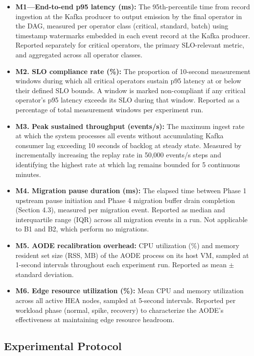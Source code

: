 \documentclass[preprint,review,12pt]{elsarticle}
\begin{document}
\begin{itemize}
\item
  \textbf{M1—End-to-end p95 latency (ms):} The 95th-percentile time from record ingestion at the Kafka producer to output emission by the final operator in the DAG, measured per operator class (critical, standard, batch) using timestamp watermarks embedded in each event record at the Kafka producer. Reported separately for critical operators, the primary SLO-relevant metric, and aggregated across all operator classes.
\item
  \textbf{M2. SLO compliance rate (\%):} The proportion of 10-second measurement windows during which all critical operators sustain p95 latency at or below their defined SLO bounds. A window is marked non-compliant if any critical operator's p95 latency exceeds its SLO during that window. Reported as a percentage of total measurement windows per experiment run.
\item
  \textbf{M3. Peak sustained throughput (events/s):} The maximum ingest rate at which the system processes all events without accumulating Kafka consumer lag exceeding 10 seconds of backlog at steady state. Measured by incrementally increasing the replay rate in 50,000 events/s steps and identifying the highest rate at which lag remains bounded for 5 continuous minutes.
\item
  \textbf{M4. Migration pause duration (ms):} The elapsed time between Phase 1 upstream pause initiation and Phase 4 migration buffer drain completion (Section 4.3), measured per migration event. Reported as median and interquartile range (IQR) across all migration events in a run. Not applicable to B1 and B2, which perform no migrations.
\item
  \textbf{M5. AODE recalibration overhead:} CPU utilization (\%) and memory resident set size (RSS, MB) of the AODE process on its host VM, sampled at 1-second intervals throughout each experiment run. Reported as mean $\pm$ standard deviation.
\item
  \textbf{M6. Edge resource utilization (\%):} Mean CPU and memory utilization across all active HEA nodes, sampled at 5-second intervals. Reported per workload phase (normal, spike, recovery) to characterize the AODE's effectiveness at maintaining edge resource headroom.
\end{itemize}

\subsection{Experimental Protocol}\label{experimental-protocol}
\end{document}
